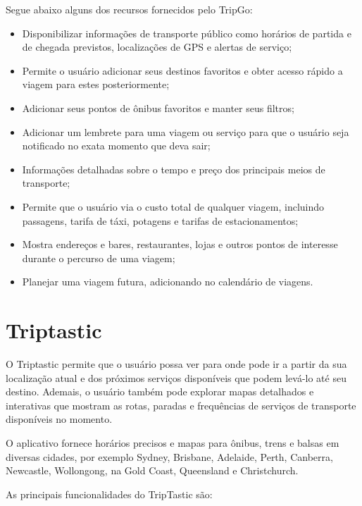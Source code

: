 Segue abaixo alguns dos recursos fornecidos pelo TripGo:

\begin{itemize}
\item Disponibilizar informações de transporte público como horários de partida e de chegada previstos, localizações de GPS e alertas de serviço;
\item Permite o usuário adicionar seus destinos favoritos e obter acesso rápido a viagem para estes posteriormente;
\item Adicionar seus pontos de ônibus favoritos e manter seus filtros;
\item Adicionar um lembrete para uma viagem ou serviço para que o usuário seja notificado no exata momento que deva sair;
\item Informações detalhadas sobre o tempo e preço dos principais meios de transporte;
\item Permite que o usuário via o custo total de qualquer viagem, incluindo passagens, tarifa de táxi, potagens e tarifas de estacionamentos;
\item Mostra endereços e bares, restaurantes, lojas e outros pontos de interesse durante o percurso de uma viagem;
\item Planejar uma viagem futura, adicionando no calendário de viagens.
\end{itemize}

\section{Triptastic}

O Triptastic permite  que o usuário possa ver para onde pode ir a partir da sua localização atual e dos próximos serviços disponíveis que podem levá-lo até seu destino. Ademais, o usuário também pode explorar mapas detalhados e interativas que mostram  as rotas, paradas e frequências de serviços de transporte disponíveis no momento. 

O aplicativo fornece horários precisos e mapas para ônibus, trens e balsas em diversas cidades, por exemplo Sydney, Brisbane, Adelaide, Perth, Canberra, Newcastle, Wollongong, na Gold Coast, Queensland e Christchurch. 

As principais funcionalidades do TripTastic são:

